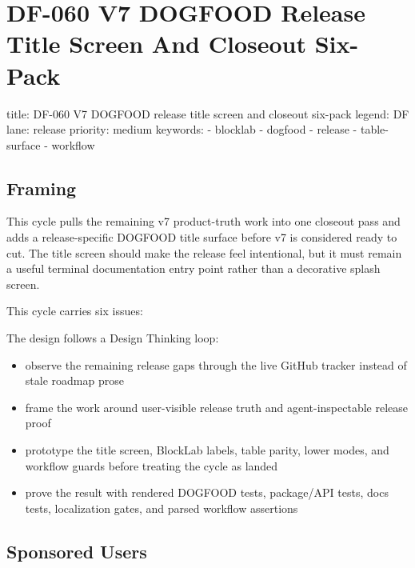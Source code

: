 \chapter{DF-060 V7 DOGFOOD Release Title Screen And Closeout Six-Pack}\label{record-101}

\smallskip

\begin{RecordMeta}
title: DF-060 V7 DOGFOOD release title screen and closeout six-pack
legend: DF
lane: release
priority: medium
keywords:
  - blocklab
  - dogfood
  - release
  - table-surface
  - workflow

\end{RecordMeta}

\section{Framing}\label{record-101-framing}

This cycle pulls the remaining v7 product-truth work into one closeout pass and adds a release-specific DOGFOOD title surface before v7 is considered ready to cut. The title screen should make the release feel intentional, but it must remain a useful terminal documentation entry point rather than a decorative splash screen.

This cycle carries six issues:



The design follows a Design Thinking loop:

\begin{itemize}
\tightlist
\item
  observe the remaining release gaps through the live GitHub tracker instead of stale roadmap prose
\item
  frame the work around user-visible release truth and agent-inspectable release proof
\item
  prototype the title screen, BlockLab labels, table parity, lower modes, and workflow guards before treating the cycle as landed
\item
  prove the result with rendered DOGFOOD tests, package/API tests, docs tests, localization gates, and parsed workflow assertions
\end{itemize}

\section{Sponsored Users}\label{record-101-sponsored-users}

